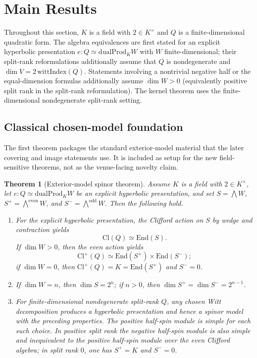 \documentclass{birkjour}
\theoremstyle{plain}
\newtheorem{theorem}{Theorem}[section]
\theoremstyle{definition}
\theoremstyle{remark}
\newcommand{\Cl}{\mathrm{Cl}}
\newcommand{\End}{\mathrm{End}}
\newcommand{\dualProd}{\mathrm{dualProd}}
\newcommand{\wedgeEven}{\bigwedge^{\mathrm{even}} W}
\newcommand{\wedgeOdd}{\bigwedge^{\mathrm{odd}} W}
\begin{document}
\section{Main Results}
\label{sec:results}

Throughout this section, $K$ is a field with $2\in K^\times$ and $Q$ is a
finite-dimensional quadratic form. The algebra equivalences are first stated
for an explicit hyperbolic presentation $e:Q \simeq \dualProd_K W$ with
$W$ finite-dimensional; their split-rank reformulations additionally assume
that $Q$ is nondegenerate and $\dim V = 2\,\mathrm{wittIndex}(Q)$. Statements
involving a nontrivial negative half or the equal-dimension formulas
additionally assume $\dim W>0$ (equivalently positive split rank in the
split-rank reformulation). The kernel theorem uses the finite-dimensional
nondegenerate split-rank setting.

\subsection*{Classical chosen-model foundation}

The first theorem packages the standard exterior-model material that the later
covering and image statements use. It is included as setup for the new
field-sensitive theorems, not as the venue-facing novelty claim.

\begin{theorem}[Exterior-model spinor theorem]
\label{thm:chosen-spinor-package}
Assume $K$ is a field with $2\in K^\times$, let
$e:Q \simeq \dualProd_K W$ be an explicit hyperbolic presentation, and set
$S=\bigwedge W$, $S^+=\wedgeEven$, and $S^-=\wedgeOdd$. Then the following hold.
\begin{enumerate}
\item For the explicit hyperbolic presentation, the Clifford action on $S$ by
  wedge and contraction yields
  \[
    \Cl(Q)\simeq \End(S).
  \]
  If $\dim W>0$, then the even action yields
  \[
    \Cl^+(Q)\simeq \End(S^+) \times \End(S^-);
  \]
  if $\dim W=0$, then $\Cl^+(Q)=K=\End(S^+)$ and $S^-=0$.
\item If $\dim W=n$, then $\dim S = 2^n$; if $n>0$, then
  $\dim S^+ = \dim S^- = 2^{n-1}$.
\item For finite-dimensional nondegenerate split-rank $Q$, any chosen Witt
  decomposition produces a hyperbolic presentation and hence a spinor model
  with the preceding properties. The positive half-spin module is simple for
  each such choice. In positive split rank the negative half-spin module is also
  simple and inequivalent to the positive half-spin module over the even
  Clifford algebra; in split rank $0$, one has $S^+=K$ and $S^-=0$.
\end{enumerate}
\end{theorem}
\end{document}
